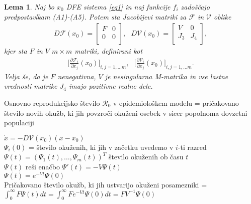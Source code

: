 \documentclass[11pt]{beamer}
\newcommand{\R}{\mathcal R}
\newcommand{\F}{\mathcal F}
\newcommand{\V}{\mathcal V}
\newtheorem{lema}{Lema}
\begin{document}
\begin{frame}
    \begin{lema} \label{lema1}
        Naj bo \(x_0\) DFE sistema \ref{eq1} in naj funkcije \(f_i\) zadoščajo predpostavlkam
        (A1)-(A5). Potem sta Jacobijevi matriki za \(\F\) in \(\V\) oblike
        \begin{align*}
            D\F(x_0)= 
            \begin{bmatrix}
            F & 0 \\
            0 & 0 \\
            \end{bmatrix},\textrm{ }
            D\V(x_0)=
            \begin{bmatrix}
            V & 0 \\
            J_3 & J_4 \\
            \end{bmatrix},
        \end{align*}
        kjer sta \(F\) in \(V\) \(m\times m\) matriki, definirani kot
        \begin{align*}
            \big[\frac{\partial \F_i}{\partial x_j}(x_0)\big]_{i,j=1,\ldots m},\textrm{ }
            \big[\frac{\partial \V_i}{\partial x_j}(x_0)\big]_{i,j=1,\ldots m}.
        \end{align*}
        Velja še, da je \(F\) nenegativna, \(V\) je nesingularna M-matrika in vse lastne
        vrednosti matrike \(J_4\) imajo pozitivne realne dele.
    \end{lema}
\end{frame}


\begin{frame}
    Osnovno reprodukcijsko število \(\R_0\) v epidemiološkem modelu = pričakovano število novih okužb, ki jih povzroči okuženi osebek v sicer popolnoma
    dovzetni populaciji
\end{frame}

\begin{frame}
    \(\dot{x}=-D\V(x_0)(x-x_0)\)\\
    \(\Psi_i(0)\) = število okuženih, ki jih v začetku uvedemo v \(i\)-ti razred\\
    \(\Psi(t)=(\Psi_1(t),\ldots,\Psi_m(t))^T\) število okuženih ob času \(t\)\\
    \(\Psi(t)\) reši enačbo \(\Psi'(t)=-V\Psi(t)\)\\
    \(\Psi(t)=e^{-Vt}\Psi(0)\)\\

    Pričakovano število okužb, ki jih ustvarijo okuženi posamezniki = \\
    \(\int_0^\infty F\Psi(t)dt = \int_0^\infty Fe^{-Vt}\Psi(0)dt = FV^{-1}\Psi(0)\)
\end{frame}
\end{document}
